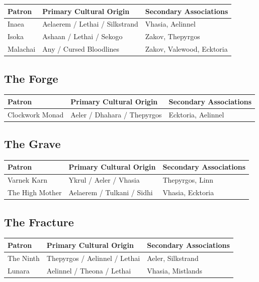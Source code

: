 \begin{longtable}{p{} p{} p{}}
\hline
\textbf{Patron} & \textbf{Primary Cultural Origin} & \textbf{Secondary Associations} \\
\hline
Inaea & Aelaerem / Lethai / Silkstrand & Vhasia, Aelinnel \\
Isoka & Ashaan / Lethai / Sekogo & Zakov, Thepyrgos \\
Malachai & Any / Cursed Bloodlines & Zakov, Valewood, Ecktoria \\
\hline
\end{longtable}

\subsection{The Forge}

\begin{longtable}{p{} p{} p{}}
\hline
\textbf{Patron} & \textbf{Primary Cultural Origin} & \textbf{Secondary Associations} \\
\hline
Clockwork Monad & Aeler / Dhahara / Thepyrgos & Ecktoria, Aelinnel \\
\hline
\end{longtable}

\subsection{The Grave}

\begin{longtable}{p{} p{} p{}}
\hline
\textbf{Patron} & \textbf{Primary Cultural Origin} & \textbf{Secondary Associations} \\
\hline
Varnek Karn & Ykrul / Aeler / Vhasia & Thepyrgos, Linn \\
The High Mother & Aelaerem / Tulkani / Sidhi & Vhasia, Ecktoria \\
\hline
\end{longtable}

\subsection{The Fracture}

\begin{longtable}{p{} p{} p{}}
\hline
\textbf{Patron} & \textbf{Primary Cultural Origin} & \textbf{Secondary Associations} \\
\hline
The Ninth & Thepyrgos / Aelinnel / Lethai & Aeler, Silkstrand \\
Lunara & Aelinnel / Theona / Lethai & Vhasia, Mistlands \\
\hline
\end{longtable}

